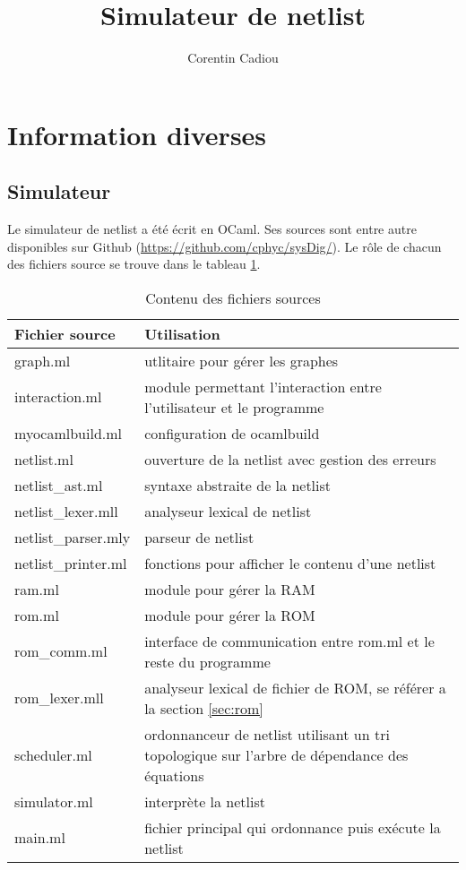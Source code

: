 \documentclass{article}
\title{Simulateur de netlist}
\author{Corentin Cadiou}
\begin{document}
  \maketitle
\section{Information diverses}
\subsection{Simulateur}
\label{sec:simulateur}

Le simulateur de netlist a été écrit en OCaml. Ses sources sont entre
autre disponibles sur Github
(\url{https://github.com/cphyc/sysDig/}). Le rôle de chacun des
fichiers source se trouve dans le tableau \ref{tab:1}.
\begin{table}
  \noindent\begin{tabular}{|l|p{}|}
    \hline
    \textbf{Fichier source} & \textbf{Utilisation} \\
    \hline
    graph.ml & utlitaire pour gérer les graphes\\
    interaction.ml & module permettant l'interaction entre l'utilisateur et le programme \\
    myocamlbuild.ml & configuration de ocamlbuild \\
    netlist.ml & ouverture de la netlist avec gestion des erreurs \\
    netlist\_ast.ml & syntaxe abstraite de la netlist \\
    netlist\_lexer.mll & analyseur lexical de netlist \\
    netlist\_parser.mly & parseur de netlist \\
    netlist\_printer.ml & fonctions pour afficher le contenu d'une
    netlist \\
    ram.ml & module pour gérer la RAM \\
    rom.ml & module pour gérer la ROM \\
    rom\_comm.ml & interface de communication entre rom.ml et le reste du
    programme \\
    rom\_lexer.mll & analyseur lexical de fichier de ROM, se référer a la
    section \ref{sec:rom} \\
    scheduler.ml & ordonnanceur de netlist utilisant un tri topologique
    sur l'arbre de dépendance des équations \\
    simulator.ml & interprète la netlist \\
    main.ml & fichier principal qui ordonnance puis exécute la netlist\\
    \hline
  \end{tabular}
  \caption{\label{tab:1}Contenu des fichiers sources}
\end{table}
\end{document}
